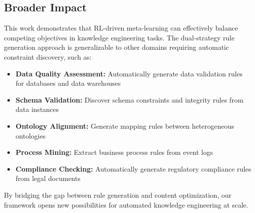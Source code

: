 \documentclass[runningheads]{llncs}
\begin{document}
\subsection{Broader Impact}

This work demonstrates that RL-driven meta-learning can effectively balance competing objectives in knowledge engineering tasks. The dual-strategy rule generation approach is generalizable to other domains requiring automatic constraint discovery, such as:

\begin{itemize}
    \item \textbf{Data Quality Assessment:} Automatically generate data validation rules for databases and data warehouses
    \item \textbf{Schema Validation:} Discover schema constraints and integrity rules from data instances
    \item \textbf{Ontology Alignment:} Generate mapping rules between heterogeneous ontologies
    \item \textbf{Process Mining:} Extract business process rules from event logs
    \item \textbf{Compliance Checking:} Automatically generate regulatory compliance rules from legal documents
\end{itemize}

By bridging the gap between rule generation and content optimization, our framework opens new possibilities for automated knowledge engineering at scale.
\end{document}

